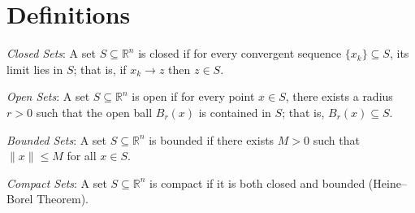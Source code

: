 \documentclass{article}
\begin{document}
\section*{Definitions}

\emph{Closed Sets}: A set \(S \subseteq \mathbb{R}^n\) is closed if for every convergent sequence
\(\{x_k\} \subseteq S\), its limit lies in \(S\); that is, if \(x_k \to z\) then \(z \in S\).

\vspace{0.2in}

\emph{Open Sets}: A set \(S \subseteq \mathbb{R}^n\) is open if for every point \(x \in S\), there exists
a radius \(r > 0\) such that the open ball \(B_r(x)\) is contained in \(S\); that is, \(B_r(x) \subseteq S\).

\vspace{0.2in}

\emph{Bounded Sets}: A set \(S \subseteq \mathbb{R}^n\) is bounded if there exists \(M > 0\) such that
\(\|x\| \le M\) for all \(x \in S\).

\vspace{0.2in}

\emph{Compact Sets}: A set \(S \subseteq \mathbb{R}^n\) is compact if it is both closed and bounded
(Heine--Borel Theorem).
\end{document}
